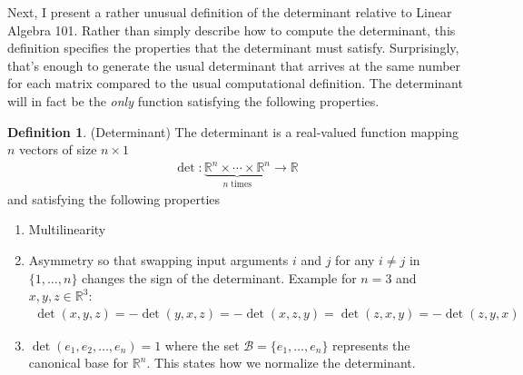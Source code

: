 \documentclass[12pt]{article}
\numberwithin{equation}{section} %
\theoremstyle{plain}
\theoremstyle{definition}
\newtheorem{defn}[thm]{Definition}
\theoremstyle{remark}
\newcommand{\R}{\mathbb{R}}
\begin{document}
Next, I present a rather unusual definition of the determinant relative
to Linear Algebra 101. Rather than simply describe how to compute the
determinant, this definition specifies the properties that the
determinant must satisfy. Surprisingly, that's enough to generate the
usual determinant that arrives at the same number for each matrix
compared to the usual computational definition. The determinant will in
fact be the \emph{only} function satisfying the following properties.

\begin{defn}{(Determinant)}
The determinant is a real-valued function mapping $n$ vectors of size
$n\times 1$
\begin{align*}
  \det: \underbrace{\R^n \times \cdots \times \R^n}_{n \;\text{times}}
  \rightarrow \R
\end{align*}
and satisfying the following properties
\begin{enumerate}
  \item Multilinearity
  \item Asymmetry so that swapping input arguments $i$ and $j$ for any
    $i\neq j$ in $\{1,\ldots,n\}$ changes the sign of the determinant.
    Example for $n=3$ and $x,y,z\in \R^3$:
    \begin{align*}
      \det(x,y,z) = -\det(y,x,z) = - \det(x,z,y)
      = \det(z,x,y) = -\det(z,y,x)
    \end{align*}
  \item $\det(e_1,e_2,\ldots,e_n)=1$ where the set
    $\mathcal{B}=\{e_1,\ldots,e_n\}$ represents the canonical base for
    $\R^n$. This states how we normalize the determinant.
\end{enumerate}
\end{defn}
\end{document}
